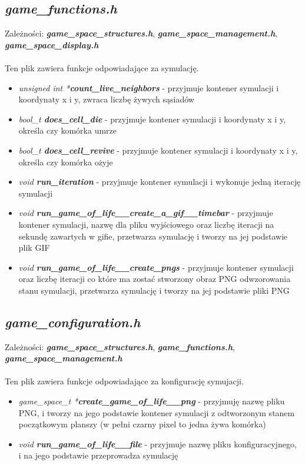 \documentclass[12pt]{article}
\begin{document}
    \subsection{\textbf{\textit{game\_functions.h}}}
        Zależności: \textit{ \textbf{game\_space\_structures.h}}, \textit{ \textbf{game\_space\_management.h}}, \textbf{\textit{game\_space\_display.h}}\\\\
        Ten plik zawiera funkcje odpowiadające za symulację.

        \begin{itemize}
            \item \textit{unsigned int *\textbf{count\_live\_neighbors}} - przyjmuje kontener symulacji i koordynaty x i y, zwraca liczbę żywych sąsiadów
            \item \textit{bool\_t \textbf{does\_cell\_die}} - przyjmuje kontener symulacji i koordynaty x i y, określa czy komórka umrze
            \item \textit{bool\_t \textbf{does\_cell\_revive}} - przyjmuje kontener symulacji i koordynaty x i y, określa czy komórka ożyje
            \item \textit{void \textbf{run\_iteration}} - przyjmuje kontener symulacji i wykonuje jedną iterację symulacji
            \item \textit{void \textbf{run\_game\_of\_life\_\_create\_a\_gif\_\_timebar}} - przyjmuje kontener symulacji, nazwę dla pliku wyjściowego oraz liczbę iteracji na sekundę zawartych w gifie, przetwarza symulację i tworzy na jej podstawie plik GIF
            \item \textit{void \textbf{run\_game\_of\_life\_\_create\_pngs}} - przyjmuje kontener symulacji oraz liczbę iteracji co które ma zostać stworzony obraz PNG odwzorowania stanu symulacji, przetwarza symulację i tworzy na jej podstawie pliki PNG
        \end{itemize}


    \subsection{\textbf{\textit{game\_configuration.h}}}
        Zależności: \textit{ \textbf{game\_space\_structures.h}}, \textbf{\textit{game\_functions.h}}, \textbf{\textit{game\_space\_management.h}}\\\\
        Ten plik zawiera funkcje odpowiadające za konfigurację symujacji.

        \begin{itemize}
            \item \textit{game\_space\_t *\textbf{create\_game\_of\_life\_\_png}} - przyjmuję nazwę pliku PNG, i tworzy na jego podstawie kontener symulacji z odtworzonym stanem początkowym planszy (w pełni czarny pixel to jedna żywa komórka)
            \item \textit{void \textbf{run\_game\_of\_life\_\_file}} - przyjmuje nazwę pliku konfiguracyjnego, i na jego podstawie przeprowadza symulację
        \end{itemize}
\end{document}
